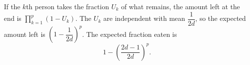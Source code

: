 If the $k$th person takes the fraction $U_k$ of what remains, the amount left at the end is $\prod_{k=1}^{p}(1-U_k)$. The $U_k$ are independent with mean $\dfrac1{2d}$, so the expected amount left is $\left(1-\dfrac1{2d}\right)^p$. The expected fraction eaten is
\[\boxed{1-\left(\dfrac{2d-1}{2d}\right)^{p}}.\]
